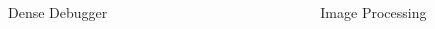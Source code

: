 \documentclass[final,hyperref={pdfpagelabels=false}]{beamer}
\begin{document}
\begin{frame}[t]
\begin{columns}[t]
\begin{column}{.465\textwidth}
\begin{block}{Dense Debugger}
\end{block}


\end{column} %

\begin{column}{.03\textwidth}\end{column} %
 
\begin{column}{.465\textwidth} %



\begin{block}{Image Processing}




\end{block}
\end{column}
\end{columns}
\end{frame}
\end{document}
